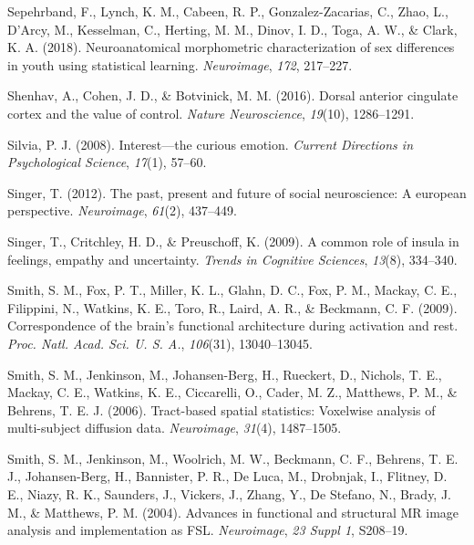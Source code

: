 \documentclass[11pt,american,]{memoir} %
\begin{document}
\leavevmode\hypertarget{ref-Sepehrband2018-dy}{}%
Sepehrband, F., Lynch, K. M., Cabeen, R. P., Gonzalez-Zacarias, C., Zhao, L., D'Arcy, M., Kesselman, C., Herting, M. M., Dinov, I. D., Toga, A. W., \& Clark, K. A. (2018). Neuroanatomical morphometric characterization of sex differences in youth using statistical learning. \emph{Neuroimage}, \emph{172}, 217--227.

\leavevmode\hypertarget{ref-shenhav2016dorsal}{}%
Shenhav, A., Cohen, J. D., \& Botvinick, M. M. (2016). Dorsal anterior cingulate cortex and the value of control. \emph{Nature Neuroscience}, \emph{19}(10), 1286--1291.

\leavevmode\hypertarget{ref-silvia2008interest}{}%
Silvia, P. J. (2008). Interest---the curious emotion. \emph{Current Directions in Psychological Science}, \emph{17}(1), 57--60.

\leavevmode\hypertarget{ref-singer2012past}{}%
Singer, T. (2012). The past, present and future of social neuroscience: A european perspective. \emph{Neuroimage}, \emph{61}(2), 437--449.

\leavevmode\hypertarget{ref-singer2009common}{}%
Singer, T., Critchley, H. D., \& Preuschoff, K. (2009). A common role of insula in feelings, empathy and uncertainty. \emph{Trends in Cognitive Sciences}, \emph{13}(8), 334--340.

\leavevmode\hypertarget{ref-Smith2009-kj}{}%
Smith, S. M., Fox, P. T., Miller, K. L., Glahn, D. C., Fox, P. M., Mackay, C. E., Filippini, N., Watkins, K. E., Toro, R., Laird, A. R., \& Beckmann, C. F. (2009). Correspondence of the brain's functional architecture during activation and rest. \emph{Proc. Natl. Acad. Sci. U. S. A.}, \emph{106}(31), 13040--13045.

\leavevmode\hypertarget{ref-Smith2006-sf}{}%
Smith, S. M., Jenkinson, M., Johansen-Berg, H., Rueckert, D., Nichols, T. E., Mackay, C. E., Watkins, K. E., Ciccarelli, O., Cader, M. Z., Matthews, P. M., \& Behrens, T. E. J. (2006). Tract-based spatial statistics: Voxelwise analysis of multi-subject diffusion data. \emph{Neuroimage}, \emph{31}(4), 1487--1505.

\leavevmode\hypertarget{ref-Smith2004-sc}{}%
Smith, S. M., Jenkinson, M., Woolrich, M. W., Beckmann, C. F., Behrens, T. E. J., Johansen-Berg, H., Bannister, P. R., De Luca, M., Drobnjak, I., Flitney, D. E., Niazy, R. K., Saunders, J., Vickers, J., Zhang, Y., De Stefano, N., Brady, J. M., \& Matthews, P. M. (2004). Advances in functional and structural MR image analysis and implementation as FSL. \emph{Neuroimage}, \emph{23 Suppl 1}, S208--19.
\end{document}
